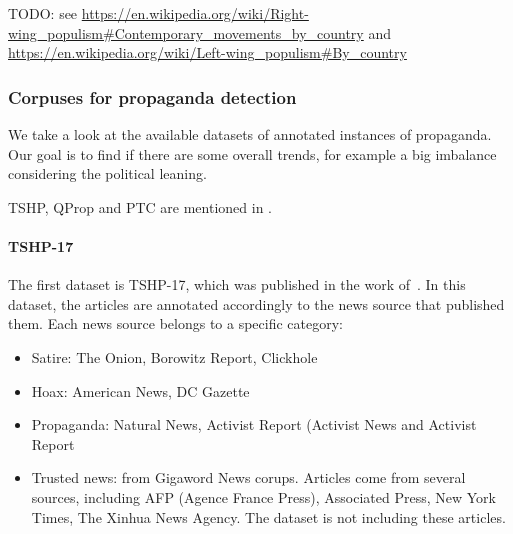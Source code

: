 TODO: see \url{https://en.wikipedia.org/wiki/Right-wing_populism#Contemporary_movements_by_country} 
and \url{https://en.wikipedia.org/wiki/Left-wing_populism#By_country}



\subsubsection{\statusgreen Corpuses for propaganda detection}

We take a look at the available datasets of annotated instances of propaganda.
Our goal is to find if there are some overall trends, for example a big imbalance considering the political leaning.

TSHP, QProp and PTC are mentioned in \cite{da2020survey}.


\paragraph{TSHP-17}

The first dataset is TSHP-17, which was published in the work of~\citet{rashkin2017truth}. In this dataset, the articles are annotated accordingly to the news source that published them. Each news source belongs to a specific category:
\begin{itemize}
    \item Satire: The Onion, Borowitz Report, Clickhole
    \item Hoax: American News, DC Gazette
    \item Propaganda: Natural News, Activist Report (Activist News and Activist Report
    \item Trusted news: from Gigaword News corups. Articles come from several sources, including AFP (Agence France Press), Associated Press, New York Times, The Xinhua News Agency. The dataset is not including these articles.
\end{itemize}


